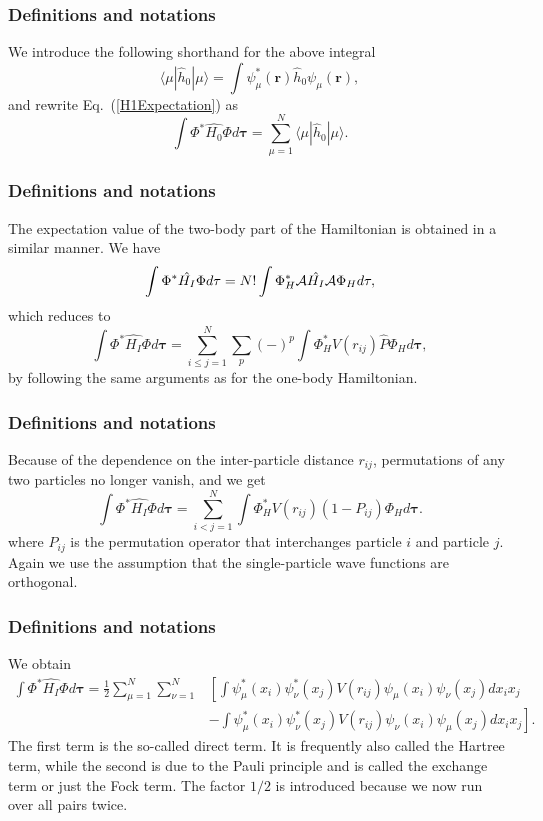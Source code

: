 \frame
{
  \frametitle{Definitions and notations}
\begin{small}
{\scriptsize
We introduce the following shorthand for the above integral
\[
\langle \mu | \hat{h}_0 | \mu \rangle = \int \psi_{\mu}^*(\mathbf{r})\hat{h}_0\psi_{\mu}(\mathbf{r}),
\]
and rewrite Eq.~(\ref{H1Expectation}) as
\begin{equation}
  \int \Phi^*\hat{H_0}\Phi  d\mathbf{\tau}
  = \sum_{\mu=1}^N \langle \mu | \hat{h}_0 | \mu \rangle.
  \label{H1Expectation1}
\end{equation}

}
\end{small}
}
\frame
{
  \frametitle{Definitions and notations}
\begin{small}
{\scriptsize
The expectation value of the two-body part of the Hamiltonian is obtained in a
similar manner. We have
\begin{equation*}
  \int \Phi^*\hat{H_I}\Phi d\mathbf{\tau} 
  = N! \int \Phi_H^*{\cal A}\hat{H_I}{\cal A}\Phi_H d\mathbf{\tau},
\end{equation*}
which reduces to
\begin{equation*}
 \int \Phi^*\hat{H_I}\Phi d\mathbf{\tau} 
  = \sum_{i\le j=1}^N \sum_{p} (-)^p\int 
  \Phi_H^*V(r_{ij})\hat{P}\Phi_H d\mathbf{\tau},
\end{equation*}
by following the same arguments as for the one-body
Hamiltonian. 
}
\end{small}
}
\frame
{
  \frametitle{Definitions and notations}
\begin{small}
{\scriptsize
Because of the dependence on the inter-particle distance $r_{ij}$,  permutations of
any two particles no longer vanish, and we get
\begin{equation*}
  \int \Phi^*\hat{H_I}\Phi d\mathbf{\tau} 
  = \sum_{i < j=1}^N \int  
  \Phi_H^*V(r_{ij})(1-P_{ij})\Phi_H d\mathbf{\tau}.
\end{equation*}
where $P_{ij}$ is the permutation operator that interchanges
particle $i$ and particle $j$. Again we use the assumption that the single-particle wave functions
are orthogonal. 
}
\end{small}
}
\frame
{
  \frametitle{Definitions and notations}
\begin{small}
{\scriptsize
We obtain
\begin{equation}
\begin{split}
  \int \Phi^*\hat{H_I}\Phi d\mathbf{\tau} 
  = \frac{1}{2}\sum_{\mu=1}^N\sum_{\nu=1}^N
    &\left[ \int \psi_{\mu}^*(x_i)\psi_{\nu}^*(x_j)V(r_{ij})\psi_{\mu}(x_i)\psi_{\nu}(x_j)
    dx_ix_j \right.\\
  &\left.
  - \int \psi_{\mu}^*(x_i)\psi_{\nu}^*(x_j)
  V(r_{ij})\psi_{\nu}(x_i)\psi_{\mu}(x_j)
  dx_ix_j
  \right]. \label{H2Expectation}
\end{split}
\end{equation}
The first term is the so-called direct term. It is frequently also called the  Hartree term, 
while the second is due to the Pauli principle and is called
the exchange term or just the Fock term.
The factor  $1/2$ is introduced because we now run over
all pairs twice. 
}
\end{small}
}
